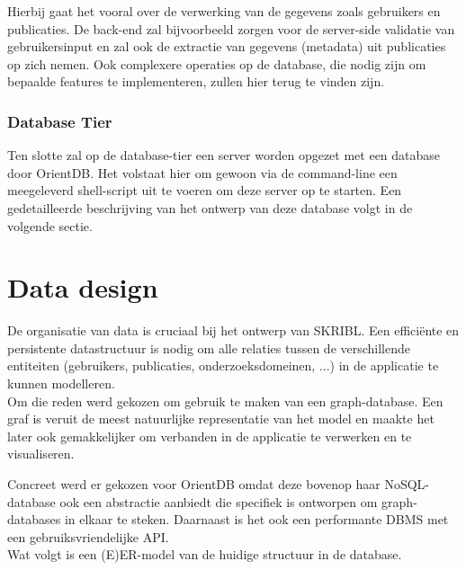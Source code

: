 \documentclass{article}
\begin{document}
Hierbij gaat het vooral over de verwerking van de gegevens zoals gebruikers en publicaties. De back-end zal bijvoorbeeld zorgen voor de server-side validatie van gebruikersinput en zal ook de extractie van gegevens (metadata) uit publicaties op zich nemen. Ook complexere operaties op de database, die nodig zijn om bepaalde features te implementeren, zullen hier terug te vinden zijn.

\subsubsection{Database Tier}

Ten slotte zal op de database-tier een server worden opgezet met een database door OrientDB. Het volstaat hier om gewoon via de command-line een meegeleverd shell-script uit te voeren om deze server op te starten.
Een gedetailleerde beschrijving van het ontwerp van deze database volgt in de volgende sectie. 

\clearpage

\section{Data design}
\label{sec:data}

De organisatie van data is cruciaal bij het ontwerp van SKRIBL. Een effici\"ente en persistente datastructuur is nodig om alle relaties tussen de verschillende entiteiten (gebruikers, publicaties, onderzoeksdomeinen, ...) in de applicatie te kunnen modelleren. \\

Om die reden werd gekozen om gebruik te maken van een graph-database. Een graf is veruit de meest natuurlijke representatie van het model en maakte het later ook gemakkelijker om verbanden in de applicatie te verwerken en te visualiseren. 

Concreet werd er gekozen voor OrientDB omdat deze bovenop haar NoSQL-database ook een abstractie aanbiedt die specifiek is ontworpen om graph-databases in elkaar te steken. Daarnaast is het ook een performante DBMS met een gebruiksvriendelijke API. \\

Wat volgt is een (E)ER-model van de huidige structuur in de database.
\end{document}
